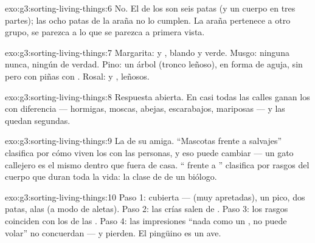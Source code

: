 \begin{solution}{exo:g3:sorting-living-things:6}
No. El  de los  son seis patas (y un cuerpo en tres
partes); las ocho patas de la araña no lo cumplen. La araña pertenece
a otro grupo, se parezca a lo que se parezca a primera vista.
\end{solution}

\begin{solution}{exo:g3:sorting-living-things:7}
Margarita:  y ,  blando y verde. Musgo: ninguna
 nunca, ningún  de verdad. Pino: un árbol (tronco leñoso),
 en forma de aguja, sin  pero con piñas con .
Rosal:  y ,  leñosos.
\end{solution}

\begin{solution}{exo:g3:sorting-living-things:8}
Respuesta abierta. En casi todas las calles ganan los  con
diferencia --- hormigas, moscas, abejas, escarabajos, mariposas ---
y las  quedan segundas.
\end{solution}

\begin{solution}{exo:g3:sorting-living-things:9}
La de su amiga. ``Mascotas frente a salvajes'' clasifica por cómo
viven los  con las personas, y eso puede cambiar --- un gato
callejero es el mismo  dentro que fuera de casa. ``
frente a '' clasifica por rasgos del cuerpo que duran toda la
vida: la clase de  de un biólogo.
\end{solution}

\begin{solution}{exo:g3:sorting-living-things:10}
Paso 1: cubierta ---  (muy apretadas), un pico, dos patas, alas
(a modo de aletas). Paso 2: las crías salen de . Paso 3: los
rasgos coinciden con los de las . Paso 4: las impresiones ``nada
como un , no puede volar'' no concuerdan --- y pierden. El pingüino
es un ave.
\end{solution}
